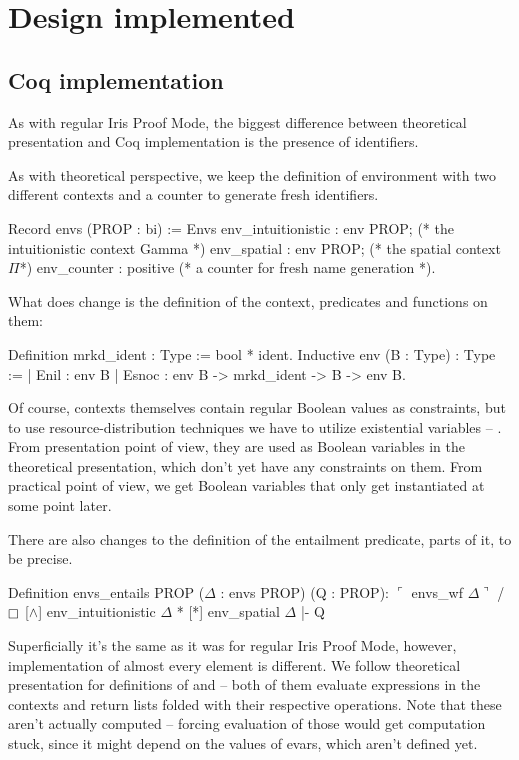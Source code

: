 \section{Design implemented}

\subsection{Coq implementation}
\label{subsec:ipm_constr_coq_implementation}

As with regular Iris Proof Mode, the biggest difference between theoretical presentation and Coq implementation is the presence of identifiers.

As with theoretical perspective, we keep the definition of environment with two different contexts and a counter to generate fresh identifiers.
\begin{coq}
  Record envs (PROP : bi) := Envs {
    env_intuitionistic : env PROP; (* the intuitionistic context Gamma *)
    env_spatial : env PROP; (* the spatial context $\Pi$*)
    env_counter : positive (* a counter for fresh name generation *)}.
\end{coq}

What does change is the definition of the context, predicates and functions on them:
\begin{coq}
  Definition mrkd_ident : Type := bool * ident.
  Inductive env (B : Type) : Type :=
  | Enil : env B
  | Esnoc : env B -> mrkd_ident -> B -> env B.
\end{coq}

Of course, contexts themselves contain regular Boolean values as constraints, but to use resource-distribution techniques we have to utilize existential variables -- \citet[Section 2.2.1]{thecoqdevelopmentteamCoqProofAssistant2020}.
From presentation point of view, they are used as Boolean variables in the theoretical presentation, which don't yet have any constraints on them.
From practical point of view, we get Boolean variables that only get instantiated at some point later.

There are also changes to the definition of the entailment predicate, parts of it, to be precise.
\begin{coq}
  Definition envs_entails {PROP} ($\Delta$ : envs PROP) (Q : PROP):
  $\ulcorner$ envs_wf $\Delta \urcorner$ /\ $\intuit$ [$\wedge$] env_intuitionistic $\Delta$ * [*] env_spatial $\Delta$ |- Q
\end{coq}

Superficially it's the same as it was for regular Iris Proof Mode, however, implementation of almost every element is different.
We follow theoretical presentation for definitions of \coqe{$\intuit$ [$\wedge$]} and \coqe{[*]} -- both of them evaluate expressions in the contexts and return lists folded with their respective operations.
Note that these aren't actually computed -- forcing evaluation of those would get computation stuck, since it might depend on the values of evars, which aren't defined yet.

